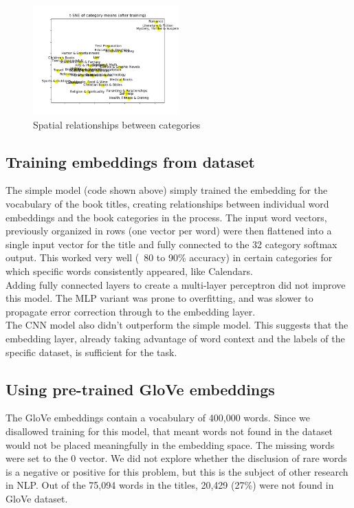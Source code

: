 \documentclass[jou,apacite, 10px]{apa6}
\begin{document}
\begin{figure}[h!]
    \centering
     \includegraphics[width=0.5\textwidth]{images/tsne-categories-small}
        \caption{Spatial relationships between categories}
\end{figure}

\subsection{Training embeddings from dataset}
The simple model (code shown above) simply trained the embedding for the vocabulary of the book titles, creating relationships between individual word embeddings and the book categories in the process. The input word vectors, previously organized in rows (one vector per word) were then flattened into a single input vector for the title and fully connected to the 32 category softmax output. This worked very well (~80 to 90\% accuracy) in certain categories for which specific words consistently appeared, like Calendars.\\

Adding fully connected layers to create a multi-layer perceptron did not improve this model. The MLP variant was prone to overfitting, and was slower to propagate error correction through to the embedding layer.\\

The CNN model also didn't outperform the simple model. This suggests that the embedding layer, already taking advantage of word context and the labels of the specific dataset, is sufficient for the task.\\

\subsection{Using pre-trained GloVe embeddings}
The GloVe embeddings contain a vocabulary of 400,000 words. Since we disallowed training for this model, that meant words not found in the dataset would not be placed meaningfully in the embedding space. The missing words were set to the 0 vector. We did not explore whether the disclusion of rare words is a negative or positive for this problem, but this is the subject of other research in NLP. Out of the 75,094 words in the titles, 20,429 (27\%) were not found in GloVe dataset.
\end{document}
